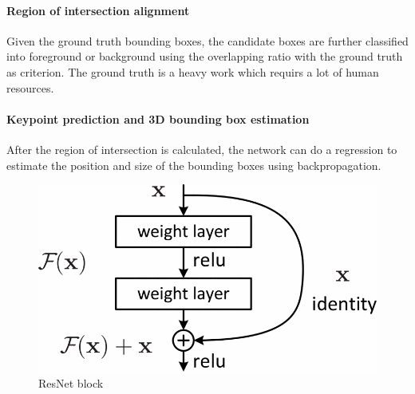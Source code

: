\documentclass[balance,upint,subscriptcorrection,varvw,nofoot, mathalfa=cal=boondoxo,spanish,french,vietnamese,russian,greek,pdf-a,fontspec,colorlinks]{asmeconf}
\begin{document}
\paragraph{Region of intersection alignment} Given the ground truth bounding boxes, the candidate boxes are further classified into foreground or background using the overlapping ratio with the ground truth as criterion. The ground truth is a heavy work which requirs a lot of human resources.
\paragraph{Keypoint prediction and 3D bounding box estimation} After the region of intersection is calculated, the network can do a regression to estimate the position and size of the bounding boxes using backpropagation.


\begin{figure}
\centering\includegraphics[width=0.7\linewidth]{resnet.png}
\caption{ResNet block}\label{res}
\end{figure}

\end{document}

